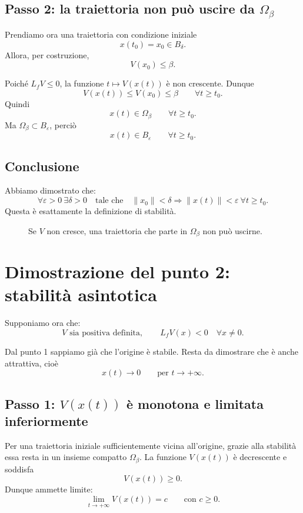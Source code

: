 \subsection*{Passo 2: la traiettoria non può uscire da \(\Omega_\beta\)}
Prendiamo ora una traiettoria con condizione iniziale
\[
x(t_0)=x_0\in B_\delta.
\]
Allora, per costruzione,
\[
V(x_0)\le \beta.
\]

Poiché \(L_fV\le 0\), la funzione \(t\mapsto V(x(t))\) è non crescente. Dunque
\[
V(x(t))\le V(x_0)\le \beta
\qquad
\forall t\ge t_0.
\]
Quindi
\[
x(t)\in \Omega_\beta
\qquad
\forall t\ge t_0.
\]
Ma \(\Omega_\beta \subset B_\varepsilon\), perciò
\[
x(t)\in B_\varepsilon
\qquad
\forall t\ge t_0.
\]

\subsection*{Conclusione}
Abbiamo dimostrato che:
\[
\forall \varepsilon>0 \ \exists \delta>0
\quad \text{tale che} \quad
\|x_0\|<\delta
\Rightarrow
\|x(t)\|<\varepsilon \ \forall t\ge t_0.
\]
Questa è esattamente la definizione di stabilità.

\begin{figure}[h!]
\centering
{}
\caption{Se \(V\) non cresce, una traiettoria che parte in \(\Omega_\beta\) non può uscirne.}
\end{figure}

\section{Dimostrazione del punto 2: stabilità asintotica}

Supponiamo ora che:
\[
V \text{ sia positiva definita},
\qquad
L_fV(x)<0 \quad \forall x\neq 0.
\]

Dal punto 1 sappiamo già che l'origine è stabile. Resta da dimostrare che è anche attrattiva, cioè
\[
x(t)\to 0 \qquad \text{per } t\to +\infty.
\]

\subsection*{Passo 1: \(V(x(t))\) è monotona e limitata inferiormente}
Per una traiettoria iniziale sufficientemente vicina all'origine, grazie alla stabilità essa resta in un insieme compatto \(\Omega_\beta\).  
La funzione \(V(x(t))\) è decrescente e soddisfa
\[
V(x(t))\ge 0.
\]
Dunque ammette limite:
\[
\lim_{t\to +\infty}V(x(t))=c
\qquad \text{con } c\ge 0.
\]

